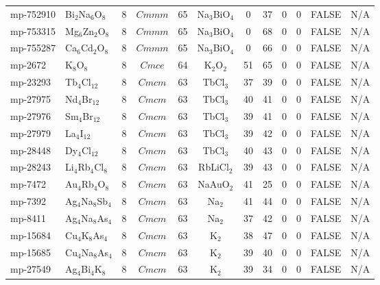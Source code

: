 {\begin{longtable}{llcccccccccc}
    mp-752910 & Bi$_{2}$Na$_{6}$O$_{8}$ & 8     & $Cmmm$ & 65    & Na$_{3}$BiO$_{4}$ & 0     & 37    & 0     & 0     & FALSE & N/A \\
    mp-753315 & Mg$_{6}$Zn$_{2}$O$_{8}$ & 8     & $Cmmm$ & 65    & Na$_{3}$BiO$_{4}$ & 0     & 68    & 0     & 0     & FALSE & N/A \\
    mp-755287 & Ca$_{6}$Cd$_{2}$O$_{8}$ & 8     & $Cmmm$ & 65    & Na$_{3}$BiO$_{4}$ & 0     & 66    & 0     & 0     & FALSE & N/A \\
    mp-2672 & K$_{8}$O$_{8}$ & 8     & $Cmce$ & 64    & K$_{2}$O$_{2}$ & 51    & 65    & 0     & 0     & FALSE & N/A \\
    mp-23293 & Tb$_{4}$Cl$_{12}$ & 8     & $Cmcm$ & 63    & TbCl$_{3}$ & 37    & 39    & 0     & 0     & FALSE & N/A \\
    mp-27975 & Nd$_{4}$Br$_{12}$ & 8     & $Cmcm$ & 63    & TbCl$_{3}$ & 40    & 41    & 0     & 0     & FALSE & N/A \\
    mp-27976 & Sm$_{4}$Br$_{12}$ & 8     & $Cmcm$ & 63    & TbCl$_{3}$ & 39    & 41    & 0     & 0     & FALSE & N/A \\
    mp-27979 & La$_{4}$I$_{12}$ & 8     & $Cmcm$ & 63    & TbCl$_{3}$ & 39    & 42    & 0     & 0     & FALSE & N/A \\
    mp-28448 & Dy$_{4}$Cl$_{12}$ & 8     & $Cmcm$ & 63    & TbCl$_{3}$ & 40    & 43    & 0     & 0     & FALSE & N/A \\
    mp-28243 & Li$_{4}$Rb$_{4}$Cl$_{8}$ & 8     & $Cmcm$ & 63    & RbLiCl$_{2}$ & 39    & 43    & 0     & 0     & FALSE & N/A \\
    mp-7472 & Au$_{4}$Rb$_{4}$O$_{8}$ & 8     & $Cmcm$ & 63    & NaAuO$_{2}$ & 41    & 25    & 0     & 0     & FALSE & N/A \\
    mp-7392 & Ag$_{4}$Na$_{8}$Sb$_{4}$ & 8     & $Cmcm$ & 63    & Na$_{2}$ & 41    & 44    & 0     & 0     & FALSE & N/A \\
    mp-8411 & Ag$_{4}$Na$_{8}$As$_{4}$ & 8     & $Cmcm$ & 63    & Na$_{2}$ & 37    & 42    & 0     & 0     & FALSE & N/A \\
    mp-15684 & Cu$_{4}$K$_{8}$As$_{4}$ & 8     & $Cmcm$ & 63    & K$_{2}$ & 38    & 47    & 0     & 0     & FALSE & N/A \\
    mp-15685 & Cu$_{4}$Na$_{8}$As$_{4}$ & 8     & $Cmcm$ & 63    & K$_{2}$ & 39    & 40    & 0     & 0     & FALSE & N/A \\
    mp-27549 & Ag$_{4}$Bi$_{4}$K$_{8}$ & 8     & $Cmcm$ & 63    & K$_{2}$ & 39    & 34    & 0     & 0     & FALSE & N/A \\

\end{longtable}}
